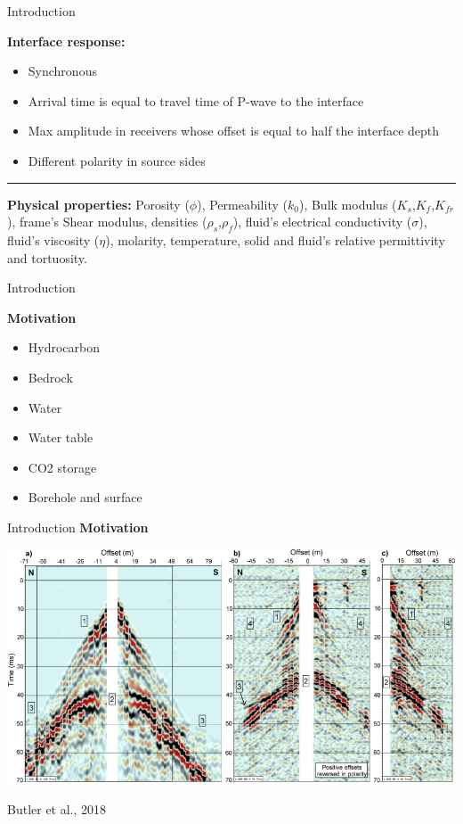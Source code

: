 \documentclass[utf8]{beamer} \usetheme{lfcr} %
\begin{document}
%
\begin{frame}{Introduction}
  \begin{center}
        \textbf{Interface response:}
        \begin{itemize}
          \item Synchronous
          \item Arrival time is equal to travel time of P-wave to the interface
          \item Max amplitude in receivers whose offset is equal to half the interface depth
          \item Different polarity in source sides
        \end{itemize}

        \rule{\textwidth}{1pt}

    \textbf{Physical properties:}
    Porosity ($\phi$), Permeability ($k_{0}$), Bulk modulus ($K_{s}$,$K_{f}$,$K_{fr}$), frame's Shear
    modulus, densities ($\rho_{s}$,$\rho_{f}$), fluid's electrical conductivity ($\sigma$),
    fluid's viscosity ($\eta$), molarity, temperature, solid and fluid's relative
    permittivity and tortuosity.
  \end{center}
\end{frame}%
%
\begin{frame}{Introduction}

  \textbf{Motivation}

  \begin{itemize}
    \item Hydrocarbon
    \item Bedrock
    \item Water
    \item Water table
    \item CO2 storage
    \item Borehole and surface
  \end{itemize}

\end{frame}
%
\begin{frame}{Introduction}
  \textbf{Motivation}

  \vspace{3.5cm}

  \begin{center}
    \includegraphics[width=\textwidth]{2018Butleretal_Ex_Field.png}
  \end{center}

  \begin{flushleft}
    {\small Butler et al., 2018}
  \end{flushleft}


\end{frame}
%
\end{document}

